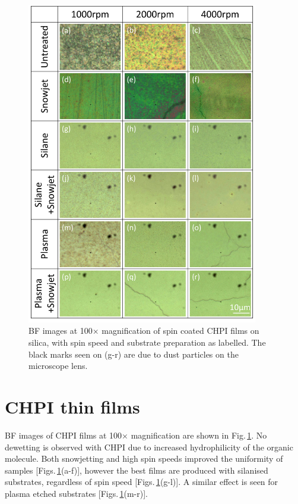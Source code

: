 \begin{figure}[h!] 
\centering    
\includegraphics[width=0.9\textwidth]{Fig5}
\caption{BF images at 100$\times$ magnification of spin coated CHPI films on silica, with spin speed and substrate preparation as labelled. The black marks seen on (g-r) are due to dust particles on the microscope lens.}
\label{4Fig5}
\end{figure}
\section{CHPI thin films}
BF images of CHPI films at 100$\times$ magnification are shown in Fig.\,\ref{4Fig5}. No dewetting is observed with CHPI due to increased hydrophilicity of the organic molecule. Both snowjetting and high spin speeds improved the uniformity of samples [Figs.\,\ref{4Fig5}(a-f)], however the best films are produced with silanised substrates, regardless of spin speed [Figs.\,\ref{4Fig5}(g-l)]. A similar effect is seen for plasma etched substrates [Figs.\,\ref{4Fig5}(m-r)].

